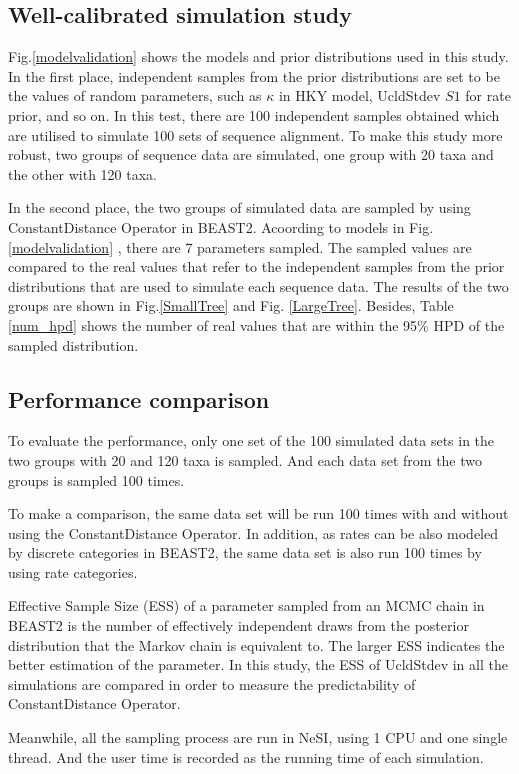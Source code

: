\documentclass{bmcart}
\begin{document}
\subsection*{Well-calibrated simulation study}
Fig.\ref{modelvalidation} shows the models and prior distributions used in this study. In the first place, independent samples from the prior distributions are set to be the values of random parameters, such as $\kappa$ in HKY model, UcldStdev $S1$ for rate prior, and so on. In this test, there are 100 independent samples obtained which are utilised to simulate 100 sets of sequence alignment. To make this study more robust, two groups of sequence data are simulated, one group with 20 taxa and the other with 120 taxa.

In the second place, the two groups of simulated data are sampled by using ConstantDistance Operator in BEAST2. Acoording to models in Fig.\ref{modelvalidation} , there are 7 parameters sampled. The sampled values are compared to the real values that refer to the independent samples from the prior distributions that are used to simulate each sequence data. The results of the two groups are shown in Fig.\ref{SmallTree} and Fig.
\ref{LargeTree}. Besides, Table \ref{num_hpd} shows the number of real values that are within the 95\% HPD of the sampled distribution.

\subsection*{Performance comparison}
To evaluate the performance, only one set of the 100 simulated data sets in the two groups with 20 and 120 taxa is sampled. And each data set from the two groups is sampled 100 times.

To make a comparison, the same data set will be run 100 times with and without using the ConstantDistance Operator. In addition, as rates can be also modeled by discrete categories in BEAST2, the same data set is also run 100 times by using rate categories.

Effective Sample Size (ESS) of a parameter sampled from an MCMC chain in BEAST2 is the number of effectively independent draws from the posterior distribution that the Markov chain is equivalent to. The larger ESS indicates the better estimation of the parameter. In this study, the ESS of UcldStdev in all the simulations are compared in order to measure the predictability of ConstantDistance Operator.

Meanwhile, all the sampling process are run in NeSI, using 1 CPU and one single thread. And the user time is recorded as the running time of each simulation.
\end{document}
